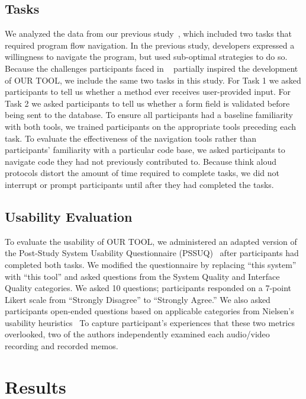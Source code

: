 \documentclass[conference]{IEEEtran}
\newcommand{\toolName}{OUR TOOL}
\begin{document}
\subsection{Tasks}
We analyzed the data from our previous study~\cite{Smith2015}, which included two tasks that required program flow navigation.
In the previous study, developers expressed a willingness to navigate the program, but used sub-optimal strategies to do so.
Because the challenges participants faced in ~\cite{Smith2015} partially inspired the development of \toolName, we include the same two tasks in this study.
For Task 1 we asked participants to tell us whether a method ever receives user-provided input.
For Task 2 we asked participants to tell us whether a form field is validated before being sent to the database.
To ensure all participants had a baseline familiarity with both tools, we trained participants on the appropriate tools preceding each task. 
To evaluate the effectiveness of the navigation tools rather than participants' familiarity with a particular code base, we asked participants to navigate code they had not previously contributed to. 
Because think aloud protocols distort the amount of time required to complete tasks, we did not interrupt or prompt participants until after they had completed the tasks.


\subsection{Usability Evaluation}
To evaluate the usability of \toolName, we administered an adapted version of the Post-Study System Usability Questionnaire (PSSUQ)~\cite{Lewis95ibmcomputer} after participants had completed both tasks. We modified the questionnaire by replacing ``this system'' with ``this tool'' and asked questions from the System Quality and Interface Quality categories. We asked 10 questions; participants responded on a 7-point Likert scale from ``Strongly Disagree'' to ``Strongly Agree.'' 	
We also asked participants open-ended questions based on applicable categories from Nielsen's usability heuristics~\cite{Nielsen1992}
To capture participant's experiences that these two metrics overlooked, two of the authors independently examined each audio/video recording and recorded memos. 

\section{Results}
\end{document}
